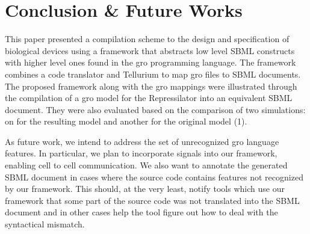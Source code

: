 \documentclass[12pt]{article}
\begin{document}
 
\section{Conclusion \& Future Works}


    This paper presented a compilation scheme to the design and specification of biological devices using a framework that abstracts low level SBML constructs with higher level ones found in the gro programming language. The framework combines a code translator and Tellurium to map gro files to SBML documents. The proposed framework along with the gro mappings were illustrated through the compilation of a gro model for the Repressilator into an equivalent SBML document. They were also evaluated based on the comparison of two simulations: on for the resulting model and another for the original model (1).

    As future work, we intend to address the set of unrecognized gro language features. In particular, we plan to incorporate signals into our framework, enabling cell to cell communication. We also want to annotate the generated SBML document in cases where the source code contains features not recognized by our framework. This should, at the very least, notify tools which use our framework that some part of the source code was not translated into the SBML document and in other cases help the tool figure out how to deal with the syntactical mismatch.




\end{document}
